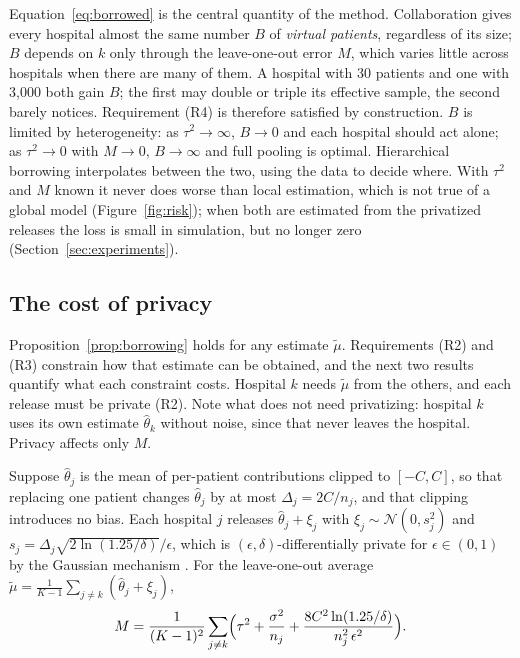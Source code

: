 \documentclass[acmsmall,screen,review]{acmart}
\theoremstyle{acmdefinition}
\begin{document}
Equation~\eqref{eq:borrowed} is the central quantity of the method. Collaboration gives every hospital almost the same number $B$ of \emph{virtual patients}, regardless of its size; $B$ depends on $k$ only through the leave-one-out error $M$, which varies little across hospitals when there are many of them. A hospital with 30 patients and one with 3,000 both gain $B$; the first may double or triple its effective sample, the second barely notices. Requirement (R4) is therefore satisfied by construction. $B$ is limited by heterogeneity: as $\tau^2\to\infty$, $B\to 0$ and each hospital should act alone; as $\tau^2\to 0$ with $M\to 0$, $B\to\infty$ and full pooling is optimal. Hierarchical borrowing interpolates between the two, using the data to decide where. With $\tau^2$ and $M$ known it never does worse than local estimation, which is not true of a global model (Figure~\ref{fig:risk}); when both are estimated from the privatized releases the loss is small in simulation, but no longer zero (Section~\ref{sec:experiments}).

\subsection{The cost of privacy}\label{sec:privacy}

Proposition~\ref{prop:borrowing} holds for any estimate $\tilde{\mu}$. Requirements (R2) and (R3) constrain how that estimate can be obtained, and the next two results quantify what each constraint costs. Hospital $k$ needs $\tilde{\mu}$ from the others, and each release must be private (R2). Note what does not need privatizing: hospital $k$ uses its own estimate $\hat{\theta}_k$ without noise, since that never leaves the hospital. Privacy affects only $M$.

\begin{proposition}\label{prop:privatized}
Suppose $\hat{\theta}_j$ is the mean of per-patient contributions clipped to $[-C,C]$, so that replacing one patient changes $\hat{\theta}_j$ by at most $\Delta_j=2C/n_j$, and that clipping introduces no bias. Each hospital $j$ releases $\hat{\theta}_j+\xi_j$ with $\xi_j\sim\mathcal{N}(0,s_j^2)$ and $s_j=\Delta_j\sqrt{2\ln(1.25/\delta)}/\epsilon$, which is $(\epsilon,\delta)$-differentially private for $\epsilon\in(0,1)$ by the Gaussian mechanism \cite{dwork2014algorithmic}. For the leave-one-out average $\tilde{\mu}=\frac{1}{K-1}\sum_{j\neq k}(\hat{\theta}_j+\xi_j)$,
\begin{equation}\label{eq:M}
M=\frac{1}{(K-1)^2}\sum_{j\neq k}\Bigl(\tau^2+\frac{\sigma^2}{n_j}+\frac{8C^2\ln(1.25/\delta)}{n_j^2\,\epsilon^2}\Bigr).
\end{equation}
\end{proposition}
\end{document}
